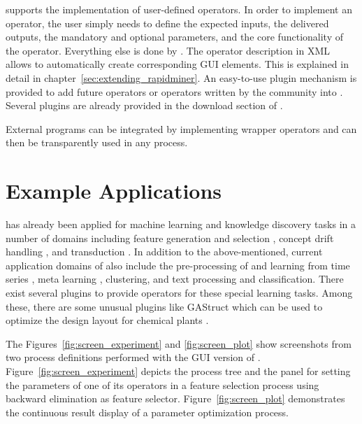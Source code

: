 \rapidminer supports the implementation of user-defined operators.
In order to implement an operator, the user simply needs to
define the expected inputs, the delivered outputs, the mandatory
and optional parameters, and the core functionality of the operator.
Everything else is done by \rapidminer. The operator description in XML
allows \rapidminer to automatically create corresponding GUI elements.
This is explained in detail in
chapter~\ref{sec:extending_rapidminer}. An easy-to-use plugin mechanism is provided
to add future operators or operators written by the \rapidminer community
into \rapidminer. Several plugins are already provided in the download
section of \rapidminer.

External programs can be integrated by implementing wrapper 
operators and can then be transparently used in any \rapidminer 
process.



\section{Example Applications}

\rapidminer has already been applied for machine learning and
knowledge discovery tasks in a number of domains including
feature generation and selection %
\cite{Felske/etal/2003a,            %
      Klinkenberg/etal/2002a,       %
      Ritthoff/Klinkenberg/2003a,   %
      Ritthoff/etal/2002b},         %
concept drift handling
\cite{Klinkenberg/Joachims/2000a,   %
      Klinkenberg/2004a,
      Klinkenberg/2003a,
      Klinkenberg/Rueping/2003a},   %
and transduction
\cite{Daniel/etal/2002a,            %
      Klinkenberg/2001a}.           %
In addition to the above-mentioned, current application domains of
\rapidminer also include
the pre-processing of and learning from time series
\cite{Mierswa/2004c,Mierswa/Morik/2005a,Mierswa/Morik/2005b},
meta learning \cite{Mierswa/Wurst/2005a,Mierswa/Wurst/2005b},
clustering, and text processing
and classification.  %
There exist several plugins to provide operators for these special
learning tasks. Among these, there are some unusual plugins like GAStruct
which can be used to optimize the design layout for chemical plants
\cite{Mierswa/2005a,Mierswa/Geisbe/2004a}.


The Figures~\ref{fig:screen_experiment} and \ref{fig:screen_plot} 
show screenshots from two process definitions performed with the GUI version of \rapidminer.
   Figure~\ref{fig:screen_experiment} depicts the process tree and
the panel for setting the parameters of one of its operators in
a feature selection process using backward elimination as feature selector.
   Figure~\ref{fig:screen_plot} demonstrates the continuous result display
of a parameter optimization process.

